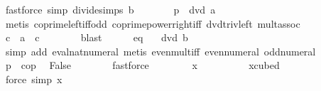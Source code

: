 \begin{isabellebody}
\ {\isacharparenleft}{\kern0pt}fastforce\ simp{\isacharcolon}{\kern0pt}\ divide{\isacharunderscore}{\kern0pt}simps\ {\isacartoucheopen}b{\isasymnoteq}{}{\isacartoucheclose}{\isacharparenright}{\kern0pt}\isanewline
\ \ \ \ \isamarkupfalse%
\ \isamarkupfalse%
\ p{\isacharcolon}{\kern0pt}\ {\isachardoublequoteopen}{}\ dvd\ a{\isachardoublequoteclose}\isanewline
\ \ \ \ \ \ \isamarkupfalse%
\ {\isacharparenleft}{\kern0pt}metis\ coprime{\isacharunderscore}{\kern0pt}left{\isacharunderscore}{\kern0pt}{}{\isacharunderscore}{\kern0pt}iff{\isacharunderscore}{\kern0pt}odd\ coprime{\isacharunderscore}{\kern0pt}power{\isacharunderscore}{\kern0pt}right{\isacharunderscore}{\kern0pt}iff\ dvd{\isacharunderscore}{\kern0pt}triv{\isacharunderscore}{\kern0pt}left\ mult{\isachardot}{\kern0pt}assoc{\isacharparenright}{\kern0pt}\isanewline
\ \ \ \ \isamarkupfalse%
\ \isamarkupfalse%
\ c\ \ {\isachardoublequoteopen}a\ {\isacharequal}{\kern0pt}\ {}{\isacharasterisk}{\kern0pt}c{\isachardoublequoteclose}\isanewline
\ \ \ \ \ \ \isamarkupfalse%
\ blast\isanewline
\ \ \ \ \isamarkupfalse%
\ eq\ \isamarkupfalse%
\ {\isachardoublequoteopen}{}\ dvd\ b{\isachardoublequoteclose}\isanewline
\ \ \ \ \ \ \isamarkupfalse%
\ {\isacharparenleft}{\kern0pt}simp\ add{\isacharcolon}{\kern0pt}\ eval{\isacharunderscore}{\kern0pt}nat{\isacharunderscore}{\kern0pt}numeral{\isacharparenright}{\kern0pt}\ {\isacharparenleft}{\kern0pt}metis\ even{\isacharunderscore}{\kern0pt}mult{\isacharunderscore}{\kern0pt}iff\ even{\isacharunderscore}{\kern0pt}numeral\ odd{\isacharunderscore}{\kern0pt}numeral{\isacharparenright}{\kern0pt}\isanewline
\ \ \ \ \isamarkupfalse%
\ p\ \ cop\ \isamarkupfalse%
\ False\isanewline
\ \ \ \ \ \ \isamarkupfalse%
\ fastforce\isanewline
\ \ \isamarkupfalse%
\isanewline
\ \ \isamarkupfalse%
\ \isamarkupfalse%
\ {\isachardoublequoteopen}{}{\isacharasterisk}{\kern0pt}x\ {\isasymin}\ {\isasymrat}\ {\isacharminus}{\kern0pt}\ {\isacharbraceleft}{\kern0pt}{}{\isacharbraceright}{\kern0pt}{\isachardoublequoteclose}\isanewline
\ \ \ \ \isamarkupfalse%
\ xcubed\ \ \isamarkupfalse%
\ {\isacharparenleft}{\kern0pt}force\ simp{\isacharcolon}{\kern0pt}\ {\isacartoucheopen}x\ {\isasymin}\ {\isasymrat}{\isacartoucheclose}{\isacharparenright}{\kern0pt}\isanewline

\end{isabellebody}
